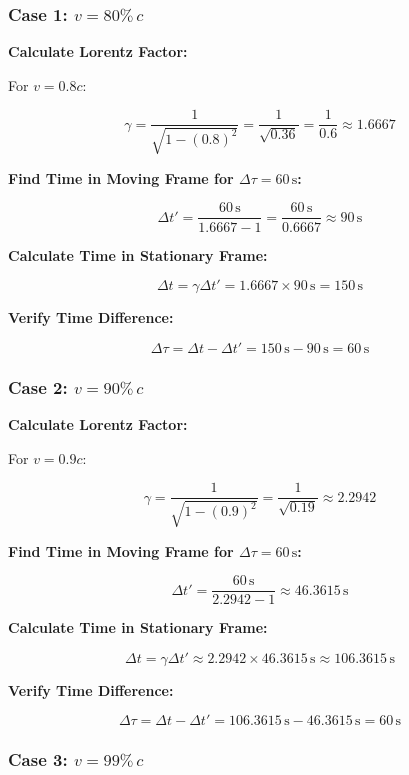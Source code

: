 \documentclass{article}
\begin{document}
\begin{multicols}{2}
\subsubsection*{Case 1: \( v = 80\% \, c \)}

\textbf{Calculate Lorentz Factor:}

For \( v = 0.8c \):

\[
\gamma = \frac{1}{\sqrt{1 - (0.8)^2}} = \frac{1}{\sqrt{0.36}} = \frac{1}{0.6} \approx 1.6667
\]

\textbf{Find Time in Moving Frame for \(\Delta \tau = 60\, \text{s}\):}

\[
\Delta t' = \frac{60\, \text{s}}{1.6667 - 1} = \frac{60\, \text{s}}{0.6667} \approx 90\, \text{s}
\]

\textbf{Calculate Time in Stationary Frame:}

\[
\Delta t = \gamma \Delta t' = 1.6667 \times 90\, \text{s} = 150\, \text{s}
\]

\textbf{Verify Time Difference:}

\[
\Delta \tau = \Delta t - \Delta t' = 150\, \text{s} - 90\, \text{s} = 60\, \text{s}
\]

\subsubsection*{Case 2: \( v = 90\% \, c \)}

\textbf{Calculate Lorentz Factor:}

For \( v = 0.9c \):

\[
\gamma = \frac{1}{\sqrt{1 - (0.9)^2}} = \frac{1}{\sqrt{0.19}} \approx 2.2942
\]

\textbf{Find Time in Moving Frame for \(\Delta \tau = 60\, \text{s}\):}

\[
\Delta t' = \frac{60\, \text{s}}{2.2942 - 1} \approx 46.3615\, \text{s}
\]

\textbf{Calculate Time in Stationary Frame:}

\[
\Delta t = \gamma \Delta t' \approx 2.2942 \times 46.3615\, \text{s} \approx 106.3615\, \text{s}
\]

\textbf{Verify Time Difference:}

\[
\Delta \tau = \Delta t - \Delta t' = 106.3615\, \text{s} - 46.3615\, \text{s} = 60\, \text{s}
\]

\subsubsection*{Case 3: \( v = 99\% \, c \)}


\end{multicols}
\end{document}
